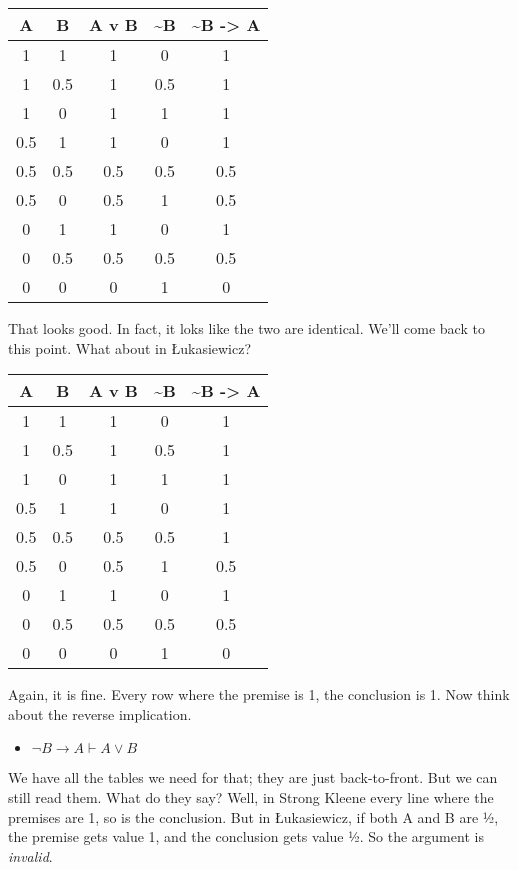 \documentclass[
]{article}
\providecommand{\tightlist}{%
  \setlength{\itemsep}{0pt}\setlength{\parskip}{0pt}}\usepackage{longtable,booktabs,array}
\begin{document}
\begin{longtable}[]{@{}ccccc@{}}
\toprule()
A & B & A v B & \textasciitilde B & \textasciitilde B -\textgreater{}
A \\
\midrule()
\endhead
1 & 1 & 1 & 0 & 1 \\
1 & 0.5 & 1 & 0.5 & 1 \\
1 & 0 & 1 & 1 & 1 \\
0.5 & 1 & 1 & 0 & 1 \\
0.5 & 0.5 & 0.5 & 0.5 & 0.5 \\
0.5 & 0 & 0.5 & 1 & 0.5 \\
0 & 1 & 1 & 0 & 1 \\
0 & 0.5 & 0.5 & 0.5 & 0.5 \\
0 & 0 & 0 & 1 & 0 \\
\bottomrule()
\end{longtable}

That looks good. In fact, it loks like the two are identical. We'll come
back to this point. What about in Łukasiewicz?

\begin{longtable}[]{@{}ccccc@{}}
\toprule()
A & B & A v B & \textasciitilde B & \textasciitilde B -\textgreater{}
A \\
\midrule()
\endhead
1 & 1 & 1 & 0 & 1 \\
1 & 0.5 & 1 & 0.5 & 1 \\
1 & 0 & 1 & 1 & 1 \\
0.5 & 1 & 1 & 0 & 1 \\
0.5 & 0.5 & 0.5 & 0.5 & 1 \\
0.5 & 0 & 0.5 & 1 & 0.5 \\
0 & 1 & 1 & 0 & 1 \\
0 & 0.5 & 0.5 & 0.5 & 0.5 \\
0 & 0 & 0 & 1 & 0 \\
\bottomrule()
\end{longtable}

Again, it is fine. Every row where the premise is 1, the conclusion is
1. Now think about the reverse implication.

\begin{itemize}
\tightlist
\item
  \(\neg B \rightarrow A \vdash A \vee B\)
\end{itemize}

We have all the tables we need for that; they are just back-to-front.
But we can still read them. What do they say? Well, in Strong Kleene
every line where the premises are 1, so is the conclusion. But in
Łukasiewicz, if both A and B are ½, the premise gets value 1, and the
conclusion gets value ½. So the argument is \emph{invalid}.
\end{document}
